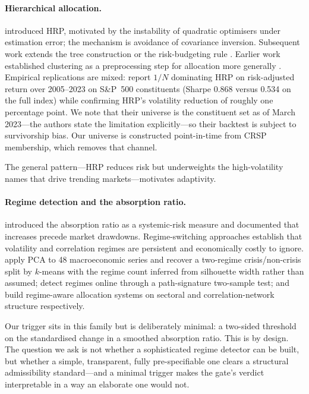 \documentclass[12pt,letterpaper]{article}
\begin{document}
\paragraph{Hierarchical allocation.} \citet{lopezdeprado2016} introduced HRP,
motivated by the instability of quadratic optimisers under estimation error; the
mechanism is avoidance of covariance inversion. Subsequent work extends the tree
construction \citep{avellaneda2019,pergher2026} or the risk-budgeting rule
\citep{molyboga2020}. Earlier work established clustering as a preprocessing step
for allocation more generally \citep{leon2017}. Empirical replications are mixed:
\citet{dekovic2025} report $1/N$ dominating HRP on risk-adjusted return over
2005--2023 on S\&P~500 constituents (Sharpe 0.868 versus 0.534 on the full index)
while confirming HRP's volatility reduction of roughly one percentage point. We note
that their universe is the constituent set as of March 2023---the authors state the
limitation explicitly---so their backtest is subject to survivorship bias. Our
universe is constructed point-in-time from CRSP membership, which removes that
channel.

The general pattern---HRP reduces risk but underweights the high-volatility names
that drive trending markets---motivates adaptivity.

\paragraph{Regime detection and the absorption ratio.} \citet{kritzman2011}
introduced the absorption ratio as a systemic-risk measure and documented that
increases precede market drawdowns. Regime-switching approaches
\citep{hamilton1989,kimnelson1998,angtimmermann2012} establish that volatility and
correlation regimes are persistent and economically costly to ignore.
\citet{akioyamen2020} apply PCA to 48 macroeconomic series and recover a two-regime
crisis/non-crisis split by $k$-means with the regime count inferred from silhouette
width rather than assumed; \citet{horvathissa2023} detect regimes online through a
path-signature two-sample test; \citet{zhang2025} and \citet{kriuk2026} build
regime-aware allocation systems on sectoral and correlation-network structure
respectively.

Our trigger sits in this family but is deliberately minimal: a two-sided threshold on
the standardised change in a smoothed absorption ratio. This is by design. The
question we ask is not whether a sophisticated regime detector can be built, but
whether a simple, transparent, fully pre-specifiable one clears a structural
admissibility standard---and a minimal trigger makes the gate's verdict
interpretable in a way an elaborate one would not.
\end{document}
